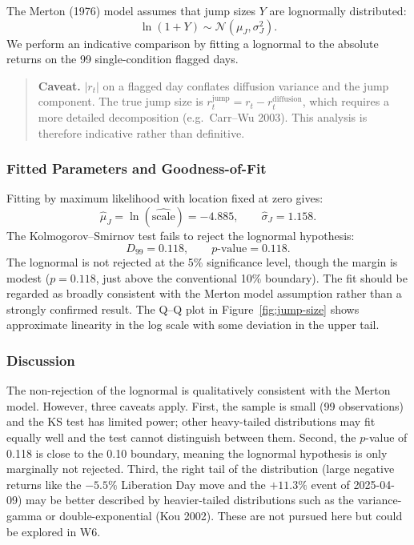 \documentclass[12pt]{article}
\begin{document}
The Merton (1976) model assumes that jump sizes $Y$ are lognormally distributed:
\[
\ln(1+Y)\sim \mathcal{N}(\mu_J,\sigma_J^2).
\]
We perform an indicative comparison by fitting a lognormal to the absolute returns on the 99 single-condition flagged days.

\begin{quote}
\textbf{Caveat.} $|r_t|$ on a flagged day conflates diffusion variance and the jump component. The true jump size is $r_t^{\text{jump}} = r_t - r_t^{\text{diffusion}}$, which requires a more detailed decomposition (e.g.\ Carr--Wu 2003). This analysis is therefore indicative rather than definitive.
\end{quote}

\subsubsection*{Fitted Parameters and Goodness-of-Fit}

Fitting by maximum likelihood with location fixed at zero gives:
\[
\hat{\mu}_J=\ln(\widehat{\mathrm{scale}})=-4.885,
\qquad
\hat{\sigma}_J=1.158.
\]
The Kolmogorov--Smirnov test fails to reject the lognormal hypothesis:
\[
D_{99}=0.118,
\qquad
p\text{-value}=0.118.
\]
The lognormal is not rejected at the 5\% significance level, though the margin is modest ($p = 0.118$, just above the conventional 10\% boundary). The fit should be regarded as broadly consistent with the Merton model assumption rather than a strongly confirmed result. The Q--Q plot in Figure~\ref{fig:jump-size} shows approximate linearity in the log scale with some deviation in the upper tail.

\subsubsection*{Discussion}

The non-rejection of the lognormal is qualitatively consistent with the Merton model. However, three caveats apply. First, the sample is small (99 observations) and the KS test has limited power; other heavy-tailed distributions may fit equally well and the test cannot distinguish between them. Second, the $p$-value of 0.118 is close to the 0.10 boundary, meaning the lognormal hypothesis is only marginally not rejected. Third, the right tail of the distribution (large negative returns like the $-5.5\%$ Liberation Day move and the $+11.3\%$ event of 2025-04-09) may be better described by heavier-tailed distributions such as the variance-gamma or double-exponential (Kou 2002). These are not pursued here but could be explored in W6.
\end{document}
